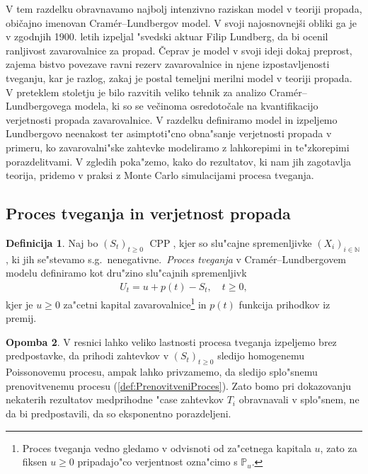 \documentclass[12pt, a4paper, reqno]{amsart}
\theoremstyle{definition}
\newtheorem{definicija}{Definicija}[section]
\newtheorem{opomba}[definicija]{Opomba}
\theoremstyle{plain}
\newcommand{\N}{\mathbb{N}}
\newcommand{\Prob}{\mathbb{P}}
\newcommand{\1}{\mathds{1}}
\DeclareMathOperator{\CPP}{CPP}
\begin{document}
    V tem razdelku obravnavamo najbolj intenzivno raziskan model v teoriji propada, običajno imenovan 
    Cramér--Lundbergov model. V svoji najosnovnejši obliki 
    ga je v zgodnjih 1900. letih izpeljal "svedski aktuar Filip Lundberg, da bi ocenil ranljivost 
    zavarovalnice za propad. Čeprav je model v svoji ideji dokaj preprost, 
     zajema bistvo povezave ravni rezerv zavarovalnice in njene izpostavljenosti tveganju, 
    kar je razlog, zakaj je postal temeljni merilni model v teoriji propada.
    V preteklem stoletju je bilo razvitih veliko tehnik za analizo Cramér--Lundbergovega modela, 
    ki so se večinoma osredotočale na kvantifikacijo verjetnosti propada zavarovalnice. V razdelku definiramo 
    model in izpeljemo Lundbergovo neenakost ter asimptoti"cno obna"sanje verjetnosti propada v primeru, ko 
    zavarovalni"ske zahtevke modeliramo z lahkorepimi in te"zkorepimi porazdelitvami. V zgledih 
    poka"zemo, kako do rezultatov, ki nam jih zagotavlja teorija, pridemo v praksi z Monte Carlo 
    simulacijami procesa tveganja.

    \subsection{Proces tveganja in verjetnost propada}

        \begin{definicija}
            Naj bo $(S_t)_{t\geq0 }$ $\CPP$, kjer so slu"cajne spremenljivke $(X_i)_{i\in\N}$, 
            ki jih se"stevamo s.g.\ nenegativne.\ \textit{Proces tveganja} v Cramér--Lundbergovem 
            modelu definiramo kot dru"zino slu"cajnih spremenljivk 
            \begin{align*}
                U_t = u + p(t) - S_t, \quad t\geq0,
            \end{align*}
            kjer je $u \geq 0$ za"cetni kapital zavarovalnice\footnote{Proces tveganja vedno gledamo 
            v odvisnoti od  za"cetnega kapitala $u$, zato za fiksen $u\geq0$ pripadajo"co verjentnost
            ozna"cimo s $\Prob_u$.} in $p(t)$ funkcija prihodkov iz premij. 
            \label{def:procesTveganja}
        \end{definicija}

        \begin{opomba}
            V resnici lahko veliko lastnosti procesa tveganja izpeljemo brez predpostavke, da prihodi 
            zahtevkov v $(S_t)_{t\geq0}$ sledijo homogenemu Poissonovemu procesu,
            ampak lahko privzamemo, da sledijo splo"snemu prenovitvenemu procesu (\ref{def:PrenovitveniProces}). 
            Zato bomo pri dokazovanju nekaterih rezultatov medprihodne "case zahtevkov $T_i$ obravnavali v 
            splo"snem, ne da bi predpostavili, da so eksponentno porazdeljeni.
            \label{op:procesTveganja}
        \end{opomba}
\end{document}
